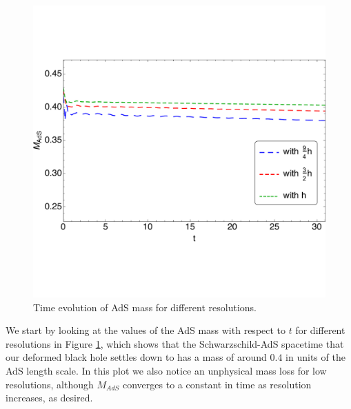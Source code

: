 \documentclass[a4paper,11pt]{article}
\begin{document}
\begin{figure}[!h]
        \centering
        \includegraphics[width=4.5in,clip=true]{plots/timeseries/AdSmass/fullplotfillregtAdSmassallres.pdf}
\parbox{5.0in}{\caption{Time evolution of AdS mass for different resolutions.
        }\label{fig:AdSmass-crop}}
\end{figure}

We start by looking at the values of the AdS mass with respect to $t$ for different resolutions in Figure \ref{fig:AdSmass-crop}, which shows that the Schwarzschild-AdS spacetime that our deformed black hole settles down to has a mass of around $0.4$ in units of the AdS length scale. In this plot we also notice an unphysical mass loss for low resolutions, although $M_{AdS}$ converges to a constant in time as resolution increases, as desired.

\end{document}
